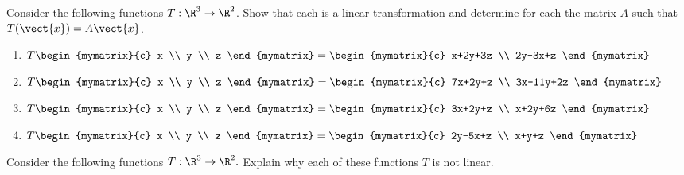 \begin{enumialphparenastyle}
\begin{ex} Consider the following functions $T:\R^{3}\rightarrow \R^{2}$.
Show that each is a linear transformation and determine for each the matrix $A$ such that 
$T(\vect{x})=A\vect{x}$.

\begin{enumerate}
\item $T\begin{mymatrix}{c}
x \\
y \\
z
\end{mymatrix} =\begin{mymatrix}{c}
x+2y+3z \\
2y-3x+z
\end{mymatrix} $

\item $T\begin{mymatrix}{c}
x \\
y \\
z
\end{mymatrix} =\begin{mymatrix}{c}
7x+2y+z \\
3x-11y+2z
\end{mymatrix} $

\item $T\begin{mymatrix}{c}
x \\
y \\
z
\end{mymatrix} =\begin{mymatrix}{c}
3x+2y+z \\
x+2y+6z
\end{mymatrix} $

\item $T\begin{mymatrix}{c}
x \\
y \\
z
\end{mymatrix} =\begin{mymatrix}{c}
2y-5x+z \\
x+y+z
\end{mymatrix} $
\end{enumerate}
\end{ex}

\begin{ex} Consider the following functions $T:\R^{3}\rightarrow \R^{2}.$
Explain why each of these functions $T$ is not linear.


\end{ex}
\end{enumialphparenastyle}
